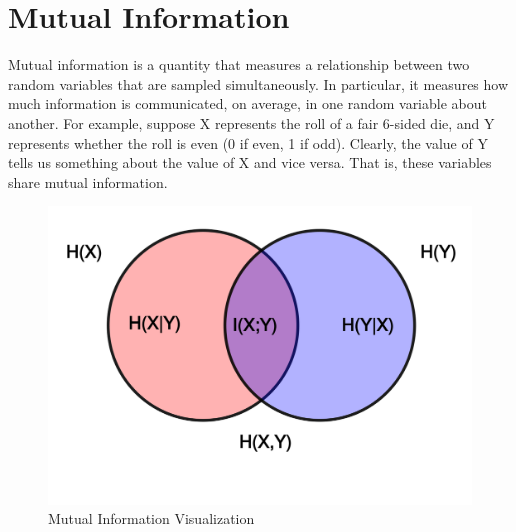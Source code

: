 \documentclass{article}
\begin{document}
\section{Mutual Information}
\vspace{2mm}
\begin{flushleft}
Mutual information is a quantity that measures a relationship between two random variables that are sampled simultaneously. In particular, it measures how much information is communicated, on average, in one random variable about another. For example, suppose X represents the roll of a fair 6-sided die, and Y represents whether the roll is even (0 if even, 1 if odd). Clearly, the value of Y tells us something about the value of X and vice versa. That is, these variables share mutual information. \cite{entropy&mi}
\end{flushleft}
\vspace{2mm}
\begin{figure}[ht]
    \centering
    \includegraphics[width=\linewidth]{mutual information.png}
    \caption{Mutual Information Visualization}
    \label{fig:watershed_visualization}
\end{figure}
\end{document}
